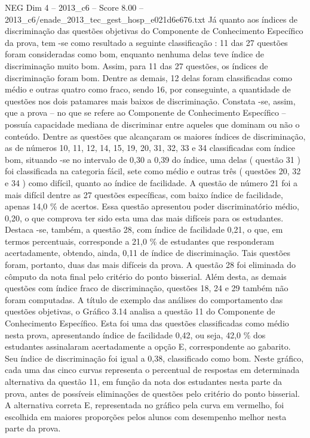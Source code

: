 \begin{textsample}{NEG Dim 4 – 2013\_c6 – Score 8.00 – 2013\_c6/enade\_2013\_tec\_gest\_hosp\_e021d6e676.txt}
Já quanto aos índices de discriminação das questões objetivas do Componente de Conhecimento Específico da prova, tem -se como resultado a seguinte classificação : 11 das 27 questões foram consideradas como bom, enquanto nenhuma delas teve índice de discriminação muito bom.
Assim, para 11 das 27 questões, os índices de discriminação foram bom.
Dentre as demais, 12 delas foram classificadas como médio e outras quatro como fraco, sendo 16, por conseguinte, a quantidade de questões nos dois patamares mais baixos de discriminação.
Constata -se, assim, que a prova – no que se refere ao Componente de Conhecimento Específico – possuía capacidade mediana de discriminar entre aqueles que dominam ou não o conteúdo.
Dentre as questões que alcançaram os maiores índices de discriminação, as de números 10, 11, 12, 14, 15, 19, 20, 31, 32, 33 e 34 classificadas com índice bom, situando -se no intervalo de 0,30 a 0,39 do índice, uma delas ( questão 31 ) foi classificada na categoria fácil, sete como médio e outras três ( questões 20, 32 e 34 ) como difícil, quanto ao índice de facilidade.
A questão de número 21 foi a mais difícil dentre as 27 questões específicas, com baixo índice de facilidade, apenas 14,0 \% de acertos.
Essa questão apresentou poder discriminatório médio, 0,20, o que comprova ter sido esta uma das mais difíceis para os estudantes.
Destaca -se, também, a questão 28, com índice de facilidade 0,21, o que, em termos percentuais, corresponde a 21,0 \% de estudantes que responderam acertadamente, obtendo, ainda, 0,11 de índice de discriminação.
Tais questões foram, portanto, duas das mais difíceis da prova.
A questão 28 foi eliminada do cômputo da nota final pelo critério do ponto bisserial.
Além desta, as demais questões com índice fraco de discriminação, questões 18, 24 e 29 também não foram computadas.
A título de exemplo das análises do comportamento das questões objetivas, o Gráfico 3.14 analisa a questão 11 do Componente de Conhecimento Específico.
Esta foi uma das questões classificadas como médio nesta prova, apresentando índice de facilidade 0,42, ou seja, 42,0 \% dos estudantes assinalaram acertadamente a opção E, correspondente ao gabarito.
Seu índice de discriminação foi igual a 0,38, classificado como bom.
Neste gráfico, cada uma das cinco curvas representa o percentual de respostas em determinada alternativa da questão 11, em função da nota dos estudantes nesta parte da prova, antes de possíveis eliminações de questões pelo critério do ponto bisserial.
A alternativa correta E, representada no gráfico pela curva em vermelho, foi escolhida em maiores proporções pelos alunos com desempenho melhor nesta parte da prova.

\end{textsample}

